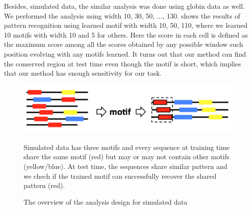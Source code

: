 \documentclass[11pt, oneside]{article}
\begin{document}
Besides, simulated data, the similar analysis was done using globin data as well. We performed the analysis using width 10, 30, 50, ..., 130.  shows the results of pattern recognition using learned motif with width 10, 50, 110, where we learned 10 motifs with width 10 and 5 for others. Here the score in each cell is defined as the maximum score among all the scores obtained by any possible window such position evolving with any motifs learned. It turns out that our method can find the conserved region at test time even though the motif is short, which implies that our method has enough sensitivity for our task.
\begin{figure}
  \centering
  \begin{minipage}{0.8\textwidth} %
  \includegraphics[width=\textwidth]{images/chart}
  {\footnotesize Simulated data has three motifs and every sequence at training time share the same motif (red) but may or may not contain other motifs (yellow/blue). At test time, the sequences share similar pattern and we chech if the trained motif can successfully recover the shared pattern (red).\par}
  \end{minipage}
  \caption{The overview of the analysis design for simulated data}
  \label{fig:design}
\end{figure}
\end{document}
